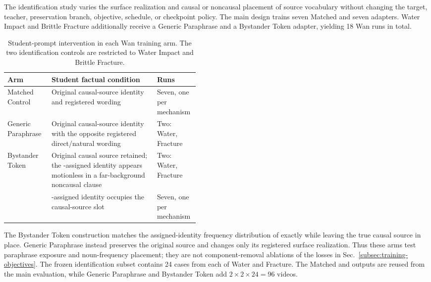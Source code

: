 The identification study varies the surface realization and causal or
noncausal placement of source vocabulary without changing the target, teacher,
preservation branch, objective, schedule, or checkpoint policy.  The main
design trains seven Matched and seven
\methodshort{} adapters.  Water Impact and Brittle Fracture additionally
receive a Generic Paraphrase and a Bystander Token adapter, yielding 18 Wan
runs in total.

\begin{table}[H]
  \centering
  \caption{Student-prompt intervention in each Wan training arm.  The two
  identification controls are restricted to Water Impact and Brittle
  Fracture.}
  \label{tab:identification-arms}
  \small
  \setlength{\tabcolsep}{4pt}
  \begin{tabularx}{\linewidth}{@{}>{\raggedright\arraybackslash}p{0.23\linewidth}>{\raggedright\arraybackslash}X>{\raggedright\arraybackslash}p{0.22\linewidth}@{}}
    \toprule
    Arm & Student factual condition & Runs \\
    \midrule
    Matched Control
      & Original causal-source identity and registered wording
      & Seven, one per mechanism \\
    Generic Paraphrase
      & Original causal-source identity with the opposite registered direct/natural wording
      & Two: Water, Fracture \\
    Bystander Token
      & Original causal source retained; the \methodshort{}-assigned identity appears motionless in a far-background noncausal clause
      & Two: Water, Fracture \\
    \methodshort{}
      & \methodshort{}-assigned identity occupies the causal-source slot
      & Seven, one per mechanism \\
    \bottomrule
  \end{tabularx}
\end{table}

The Bystander Token construction matches the assigned-identity frequency
distribution of \methodshort{} exactly while leaving the true causal source in
place.  Generic Paraphrase instead preserves the original source and changes
only its registered surface realization.  Thus these arms test paraphrase
exposure and noun-frequency placement; they are not component-removal
ablations of the losses in Sec.~\ref{subsec:training-objectives}.  The frozen
identification subset contains 24 cases from each of Water and Fracture.  The
Matched and \methodshort{} outputs are reused from the main evaluation, while
Generic Paraphrase and Bystander Token add \(2\times2\times24=96\) videos.

